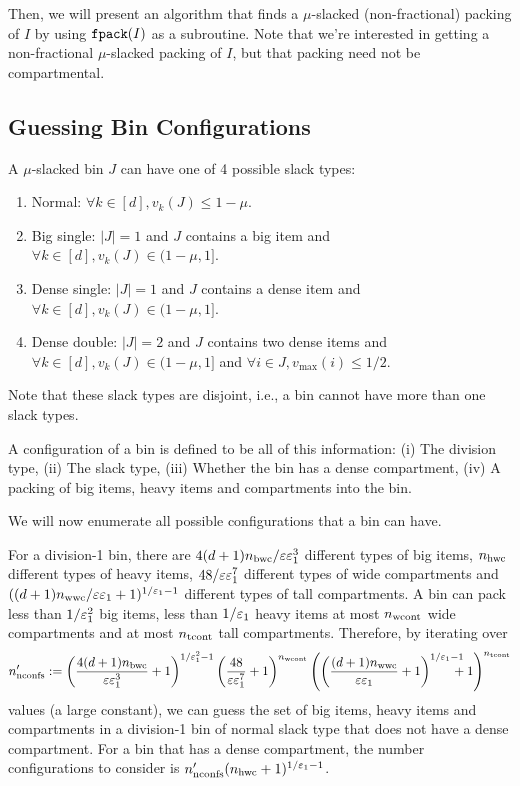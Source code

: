 Then, we will present an algorithm that finds a $\mu$-slacked
(non-fractional) packing of $I$ by using $\operatorname{\mathtt{fpack}}(I)$ as a subroutine.
Note that we're interested in getting a non-fractional $\mu$-slacked packing of $I$,
but that packing need not be compartmental.

\subsection{Guessing Bin Configurations}

A $\mu$-slacked bin $J$ can have one of 4 possible slack types:
\begin{enumerate}
\item Normal: $\forall k \in [d], v_k(J) \le 1-\mu$.
\item Big single: $|J| = 1$ and $J$ contains a big item
    and $\forall k \in [d], v_k(J) \in (1-\mu, 1]$.
\item Dense single: $|J| = 1$ and $J$ contains a dense item
    and $\forall k \in [d], v_k(J) \in (1-\mu, 1]$.
\item Dense double: $|J| = 2$ and $J$ contains two dense items
    and $\forall k \in [d], v_k(J) \in (1-\mu, 1]$
    and $\forall i \in J, v_{\max}(i) \le 1/2$.
\end{enumerate}
Note that these slack types are disjoint, i.e., a bin cannot have more than one slack types.

A configuration of a bin is defined to be all of this information:
(i) The division type,
(ii) The slack type,
(iii) Whether the bin has a dense compartment,
(iv) A packing of big items, heavy items and compartments into the bin.

We will now enumerate all possible configurations that a bin can have.

For a division-1 bin,
there are $4(d+1)n_{\mathrm{bwc}}/\varepsilon\varepsilon_1^3$ different types of big items,
$n_{\mathrm{hwc}}$ different types of heavy items,
$48/\varepsilon\varepsilon_1^7$ different types of wide compartments and
$((d+1)n_{\mathrm{wwc}}/\varepsilon\varepsilon_1 + 1)^{1/\varepsilon_1-1}$ different types of tall compartments.
A bin can pack less than $1/\varepsilon_1^2$ big items, less than $1/\varepsilon_1$ heavy items
at most $n_{\mathrm{wcont}}$ wide compartments and at most $n_{\mathrm{tcont}}$ tall compartments.
Therefore, by iterating over
\[ n_{\mathrm{nconfs}}' :=
\left(\frac{4(d+1)n_{\mathrm{bwc}}}{\varepsilon\varepsilon_1^3} + 1\right)^{1/\varepsilon_1^2-1}
\left(\frac{48}{\varepsilon\varepsilon_1^7} + 1\right)^{n_{\mathrm{wcont}}}
\left(\left(\frac{(d+1)n_{\mathrm{wwc}}}{\varepsilon\varepsilon_1}+1\right)^{1/\varepsilon_1-1}
    \hspace{-1em}+ 1\right)^{n_{\mathrm{tcont}}} \] values (a large constant),
we can guess the set of big items, heavy items and compartments
in a division-1 bin of normal slack type that does not have a dense compartment.
For a bin that has a dense compartment, the number configurations to consider is
$n_{\mathrm{nconfs}}'(n_{\mathrm{hwc}} + 1)^{1/\varepsilon_1-1}$.

